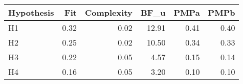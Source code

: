 \begin{table}[ht]
\centering
\begin{tabular}{lrrrrr}
  \hline
Hypothesis & Fit & Complexity & BF\_u & PMPa & PMPb \\ 
  \hline
H1 & 0.32 & 0.02 & 12.91 & 0.41 & 0.40 \\ 
  H2 & 0.25 & 0.02 & 10.50 & 0.34 & 0.33 \\ 
  H3 & 0.22 & 0.05 & 4.57 & 0.15 & 0.14 \\ 
  H4 & 0.16 & 0.05 & 3.20 & 0.10 & 0.10 \\ 
   \hline
\end{tabular}
\end{table}

